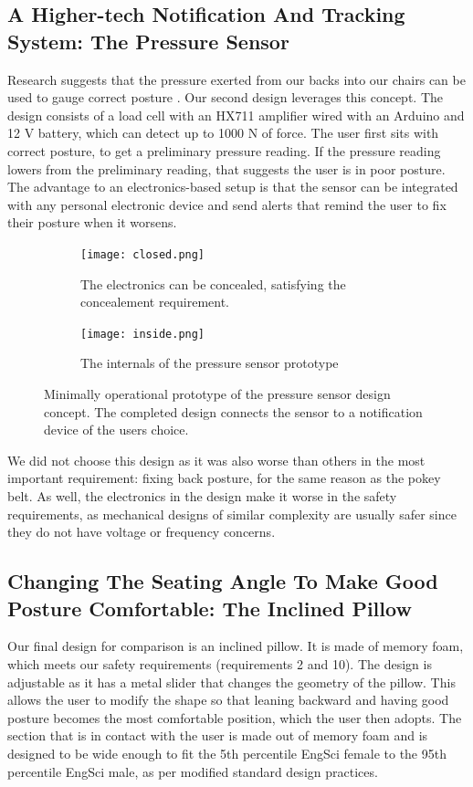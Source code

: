 \documentclass[11pt]{article}
\begin{document}
\subsection{A Higher-tech Notification And Tracking System: The Pressure Sensor}

Research suggests that the pressure exerted from our backs into our chairs can be used to gauge correct posture \cite{RefWorks:72}. Our second design leverages this concept. The design consists of a load cell with an HX711 amplifier wired with an Arduino and 12 V battery, which can detect up to 1000 N of force. The user first sits with correct posture, to get a preliminary pressure reading. If the pressure reading lowers from the preliminary reading, that suggests the user is in poor posture. The advantage to an electronics-based setup is that the sensor can be integrated with any personal electronic device and send alerts that remind the user to fix their posture when it worsens. 

\begin{figure}[H]
\centering
\begin{subfigure}{.5\linewidth}
  \centering
  \texttt{[image: closed.png]}
  \caption{The electronics can be concealed, satisfying the concealement requirement.}
\end{subfigure}%
\begin{subfigure}{.5\linewidth}
  \centering
  \texttt{[image: inside.png]}
  \caption{The internals of the pressure sensor prototype}
  \end{subfigure}
\caption{Minimally operational prototype of the pressure sensor design concept. The completed design connects the sensor to a notification device of the users choice.}
\label{fig:pressureSensorPhoto}
\end{figure}

We did not choose this design as it was also worse than others in the most important requirement: fixing back posture, for the same reason as the pokey belt. As well, the electronics in the design make it worse in the safety requirements, as mechanical designs of similar complexity are usually safer since they do not have voltage or frequency concerns.
\subsection{Changing The Seating Angle To Make Good Posture Comfortable: The Inclined Pillow}

Our final design for comparison is an inclined pillow. It is made of memory foam, which meets our safety requirements (requirements 2 and 10). The design is adjustable as it has a metal slider that changes the geometry of the pillow. This allows the user to modify the shape so that leaning backward and having good posture becomes the most comfortable position, which the user then adopts. The section that is in contact with the user is made out of memory foam and is designed to be wide enough to fit the 5th percentile EngSci female to the 95th percentile EngSci male, as per modified standard design practices. 
\end{document}
